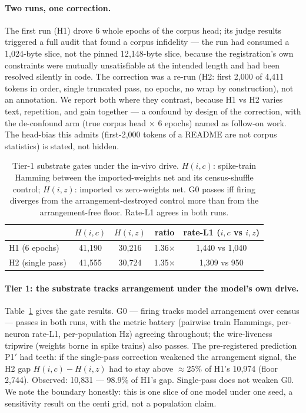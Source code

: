 \paragraph{Two runs, one correction.}
The first run (H1) drove 6 whole epochs of the corpus head; its judge
results triggered a full audit that found a corpus infidelity --- the
run had consumed a 1{,}024-byte slice, not the pinned 12{,}148-byte
slice, because the registration's own constraints were mutually
unsatisfiable at the intended length and had been resolved silently in
code. The correction was a re-run (H2: first 2{,}000 of 4{,}411 tokens
in order, single truncated pass, no epochs, no wrap by construction),
not an annotation. We report both where they contrast, because H1 vs
H2 varies text, repetition, and gain together --- a confound by design
of the correction, with the de-confound arm (true corpus head $\times$
6 epochs) named as follow-on work. The head-bias this admits
(first-2{,}000 tokens of a README are not corpus statistics) is stated,
not hidden.

\begin{table}[t]
\centering
\caption{Tier-1 substrate gates under the in-vivo drive. $H(i,c)$:
spike-train Hamming between the imported-weights net and its
census-shuffle control; $H(i,z)$: imported vs zero-weights net.
G0 passes iff firing diverges from the arrangement-destroyed control
more than from the arrangement-free floor. Rate-L1 agrees in both
runs.}
\label{tab:t1gates}
\begin{tabular}{lcccc}
\toprule
 & $H(i,c)$ & $H(i,z)$ & ratio & rate-L1 ($i,c$ vs $i,z$) \\
\midrule
H1 (6 epochs) & 41{,}190 & 30{,}216 & 1.36$\times$ & 1{,}440 vs 1{,}040 \\
H2 (single pass) & 41{,}555 & 30{,}724 & 1.35$\times$ & 1{,}309 vs 950 \\
\bottomrule
\end{tabular}
\end{table}

\paragraph{Tier 1: the substrate tracks arrangement under the model's
own drive.}
Table~\ref{tab:t1gates} gives the gate results. G0 --- firing tracks
model arrangement over census --- passes in both runs, with the
metric battery (pairwise train Hammings, per-neuron rate-L1,
per-population Hz) agreeing throughout; the wire-liveness tripwire
(weights borne in spike trains) also passes. The pre-registered
prediction P1$'$ had teeth: if the single-pass correction weakened the
arrangement signal, the H2 gap $H(i,c)-H(i,z)$ had to stay above
$\approx$25\% of H1's 10{,}974 (floor 2{,}744). Observed: 10{,}831
--- 98.9\% of H1's gap. Single-pass does not weaken G0. We note the
boundary honestly: this is one slice of one model under one seed, a
sensitivity result on the centi grid, not a population claim.


